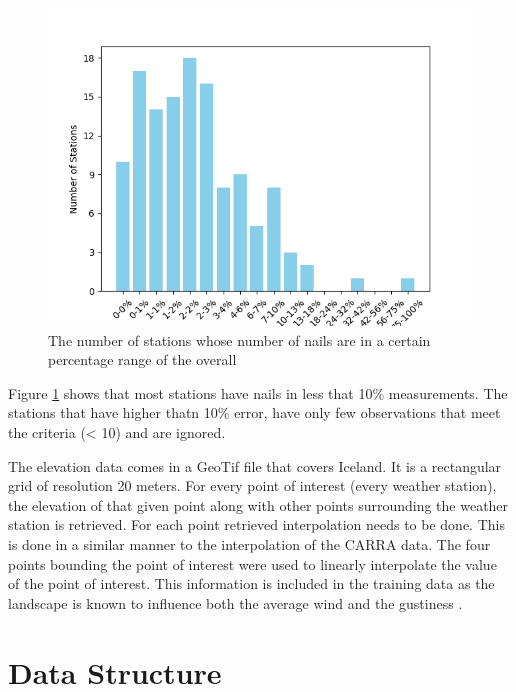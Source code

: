 \begin{figure}
    \includegraphics[scale=0.75]{Figures/error_count.png}
    \caption{The number of stations whose number of nails are in a certain percentage range of the overall}
    \label{fig:error_count}
\end{figure}

Figure \ref{fig:error_count} shows that most stations have nails in less that 10\% measurements. The stations that have higher thatn 10\% error, have only few observations that meet the criteria (< 10) and are ignored.

The elevation data comes in a GeoTif file that covers Iceland. It is a rectangular grid of resolution 20 meters. For every point of interest (every weather station), the elevation of that given point along with other points surrounding the weather station is retrieved. For each point retrieved interpolation needs to be done. This is done in a similar manner to the interpolation of the CARRA data. The four points bounding the point of interest were used to linearly interpolate the value of the point of interest. This information is included in the training data as the landscape is known to influence both the average wind and the gustiness \cite{GNP_vidtal}. 


\section{Data Structure}

